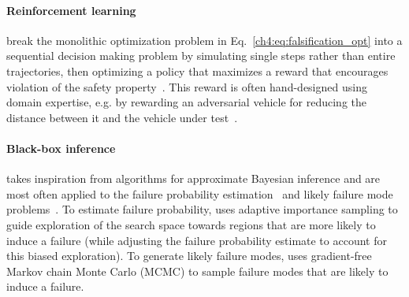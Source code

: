 \paragraph{Reinforcement learning} break the monolithic optimization problem in Eq.~\eqref{ch4:eq:falsification_opt} into a sequential decision making problem by simulating single steps rather than entire trajectories, then optimizing a policy that maximizes a reward that encourages violation of the safety property~\cite{corsoAdaptiveStressTesting2019}. This reward is often hand-designed using domain expertise, e.g. by rewarding an adversarial vehicle for reducing the distance between it and the vehicle under test~\cite{dingLearningCollideAdaptive2020a}.

\paragraph{Black-box inference} takes inspiration from algorithms for approximate Bayesian inference and are most often applied to the failure probability estimation~\cite{okellyScalableEndtoEndAutonomous2018} and likely failure mode problems~\cite{zhouRoCUSRobotController2021}. To estimate failure probability, \cite{okellyScalableEndtoEndAutonomous2018} uses adaptive importance sampling to guide exploration of the search space towards regions that are more likely to induce a failure (while adjusting the failure probability estimate to account for this biased exploration). To generate likely failure modes, \cite{zhouRoCUSRobotController2021} uses gradient-free Markov chain Monte Carlo (MCMC) to sample failure modes that are likely to induce a failure.




